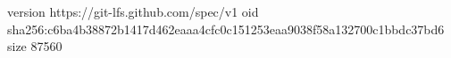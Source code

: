 version https://git-lfs.github.com/spec/v1
oid sha256:c6ba4b38872b1417d462eaaa4cfc0c151253eaa9038f58a132700c1bbdc37bd6
size 87560
